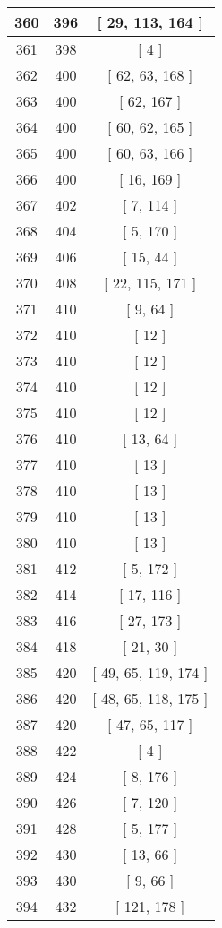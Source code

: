 \begin{center}
\begin{longtable}[H]{|| c c c ||}
\hline
360 & 396 & [ 29, 113, 164 ] \\ 
\hline
361 & 398 & [ 4 ] \\ 
\hline
362 & 400 & [ 62, 63, 168 ] \\ 
\hline
363 & 400 & [ 62, 167 ] \\ 
\hline
364 & 400 & [ 60, 62, 165 ] \\ 
\hline
365 & 400 & [ 60, 63, 166 ] \\ 
\hline
366 & 400 & [ 16, 169 ] \\ 
\hline
367 & 402 & [ 7, 114 ] \\ 
\hline
368 & 404 & [ 5, 170 ] \\ 
\hline
369 & 406 & [ 15, 44 ] \\ 
\hline
370 & 408 & [ 22, 115, 171 ] \\ 
\hline
371 & 410 & [ 9, 64 ] \\ 
\hline
372 & 410 & [ 12 ] \\ 
\hline
373 & 410 & [ 12 ] \\ 
\hline
374 & 410 & [ 12 ] \\ 
\hline
375 & 410 & [ 12 ] \\ 
\hline
376 & 410 & [ 13, 64 ] \\ 
\hline
377 & 410 & [ 13 ] \\ 
\hline
378 & 410 & [ 13 ] \\ 
\hline
379 & 410 & [ 13 ] \\ 
\hline
380 & 410 & [ 13 ] \\ 
\hline
381 & 412 & [ 5, 172 ] \\ 
\hline
382 & 414 & [ 17, 116 ] \\ 
\hline
383 & 416 & [ 27, 173 ] \\ 
\hline
384 & 418 & [ 21, 30 ] \\ 
\hline
385 & 420 & [ 49, 65, 119, 174 ] \\ 
\hline
386 & 420 & [ 48, 65, 118, 175 ] \\ 
\hline
387 & 420 & [ 47, 65, 117 ] \\ 
\hline
388 & 422 & [ 4 ] \\ 
\hline
389 & 424 & [ 8, 176 ] \\ 
\hline
390 & 426 & [ 7, 120 ] \\ 
\hline
391 & 428 & [ 5, 177 ] \\ 
\hline
392 & 430 & [ 13, 66 ] \\ 
\hline
393 & 430 & [ 9, 66 ] \\ 
\hline
394 & 432 & [ 121, 178 ] \\ 

\end{longtable}
\end{center}
